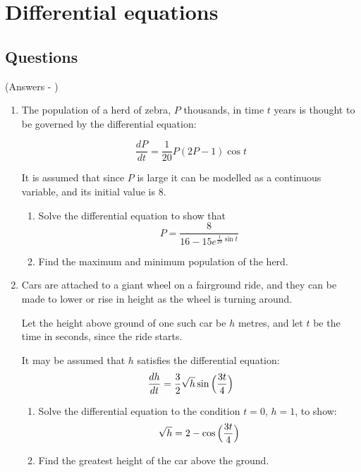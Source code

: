 \documentclass[../main.tex]{subfiles}
\begin{document}
\section{Differential equations}

\subsection*{Questions}
(Answers - {\pageref{Differential equations answers}})
\label{Differential equations}
\begin{enumerate}[itemsep=0.7cm]
    \item 
    The population of a herd of zebra, $P$ thousands, in time $t$ years is thought to be governed by the differential equation:

    \[\frac{dP}{dt}=\frac{1}{20}P(2P-1)\cos{t}\]

    It is assumed that since $P$ is large it can be modelled as a continuous variable, and its
    initial value is 8.

    \begin{enumerate}[itemsep=0.5cm]
        \item   
        Solve the differential equation to show that 
        \[P=\frac{8}{16-15e^{\frac{1}{20}\sin{t}}}\]

       \item 
       Find the maximum and minimum population of the herd.

    \end{enumerate}

    \item
    Cars are attached to a giant wheel on a fairground ride, and they can be made to lower or rise in height as the wheel is turning around.

    Let the height above ground of one such car be $h$ metres, and let $t$ be the time in seconds, since the ride starts.

    It may be assumed that $h$ satisfies the differential equation:
    \[\frac{dh}{dt}=\frac{3}{2}\sqrt{h}\sin{\Bigl(\frac{3t}{4}\Bigr)}\]

    \begin{enumerate}[itemsep=0.5cm]
        \item
        Solve the differential equation to the condition $t=0$, $h=1$, to show:
        \[\sqrt{h}=2-\cos{\Bigl(\frac{3t}{4}\Bigr)}\]

        \item
        Find the greatest height of the car above the ground.


\end{enumerate}
\end{enumerate}
\end{document}
